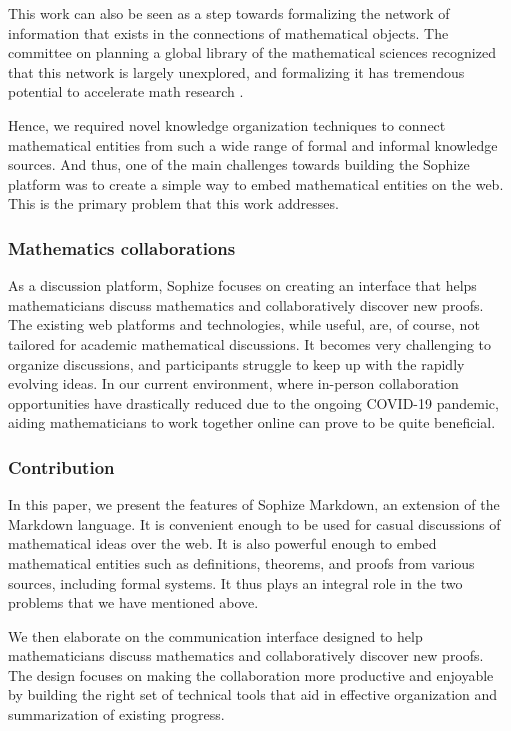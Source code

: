 \documentclass[a4paper]{article}
\begin{document}
This work can also be seen as a step towards formalizing the network of information that exists in the connections of mathematical objects. The committee on planning a global library of the mathematical sciences recognized that this network is largely unexplored, and formalizing it has tremendous potential to accelerate math research \cite{sciences2014developing}.

Hence, we required novel knowledge organization techniques to connect mathematical entities from such a wide range of formal and informal knowledge sources. And thus, one of the main challenges towards building the Sophize platform was to create a simple way to embed mathematical entities on the web. This is the primary problem that this work addresses.

\subsubsection*{Mathematics collaborations}

As a discussion platform, Sophize focuses on creating an interface that helps mathematicians discuss mathematics and collaboratively discover new proofs. The existing web platforms and technologies, while useful, are, of course, not tailored for academic mathematical discussions. It becomes very challenging to organize discussions, and participants struggle to keep up with the rapidly evolving ideas. In our current environment, where in-person collaboration opportunities have drastically reduced due to the ongoing COVID-19 pandemic, aiding mathematicians to work together online can prove to be quite beneficial.


\subsubsection*{Contribution}

In this paper, we present the features of Sophize Markdown, an extension of the Markdown language. It is convenient enough to be used for casual discussions of mathematical ideas over the web. It is also powerful enough to embed mathematical entities such as definitions, theorems, and proofs from various sources, including formal systems. It thus plays an integral role in the two problems that we have mentioned above.

We then elaborate on the communication interface designed to help mathematicians discuss mathematics and collaboratively discover new proofs. The design focuses on making the collaboration more productive and enjoyable by building the right set of technical tools that aid in effective organization and summarization of existing progress.
\end{document}
